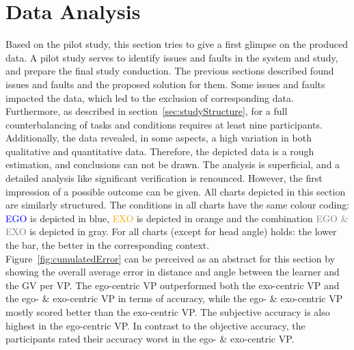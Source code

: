 \section{Data Analysis}
\label{sec:evalDataAna}
Based on the pilot study, this section tries to give a first glimpse on the produced data. A pilot study serves to identify issues and faults in the system and study, and prepare the final study conduction. The previous sections described found issues and faults and the proposed solution for them. Some issues and faults impacted the data, which led to the exclusion of corresponding data. Furthermore, as described in section~\ref{sec:studyStructure}, for a full counterbalancing of tasks and conditions requires at least nine participants. Additionally, the data revealed, in some aspects, a high variation in both qualitative and quantitative data. Therefore, the depicted data is a rough estimation, and conclusions can not be drawn. The analysis is superficial, and a detailed analysis like significant verification is renounced. However, the first impression of a possible outcome can be given. All charts depicted in this section are similarly structured. The conditions in all charts have the same colour coding: \textcolor{blue}{EGO} is depicted in blue, \textcolor{orange}{EXO} is depicted in orange and the combination \textcolor{gray}{EGO \& EXO} is depicted in gray. For all charts (except for head angle) holds: the lower the bar, the better in the corresponding context.\\
Figure~\ref{fig:cumulatedError} can be perceived as an abstract for this section by showing the overall average error in distance and angle between the learner and the GV per VP. The ego-centric VP outperformed both the exo-centric VP and the ego- \& exo-centric VP in terms of accuracy, while the ego- \& exo-centric VP mostly scored better than the exo-centric VP. The subjective accuracy is also highest in the ego-centric VP. In contrast to the objective accuracy, the participants rated their accuracy worst in the ego- \& exo-centric VP.
